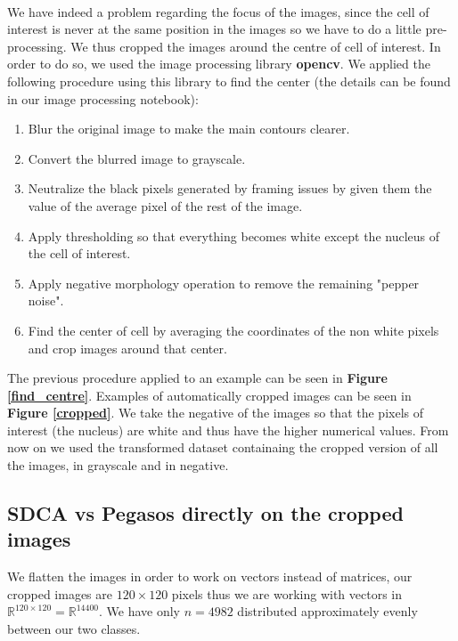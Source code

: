 \documentclass[10pt,a4paper]{article}
\begin{document}
\paragraph{}
We have indeed a problem regarding the focus of the images, since the cell of interest is never at the same position in the images so we have to do a little pre-processing. We thus cropped the images around the centre of cell of interest. In order to do so, we used the image processing library \textbf{opencv}. We applied the following procedure using this library to find the center (the details can be found in our image processing notebook): 
\begin{enumerate}
	\item Blur the original image to make the main contours clearer.
	\item Convert the blurred image to grayscale.
	\item Neutralize the black pixels generated by framing issues by given them the value of the average pixel of the rest of the image.
	\item Apply thresholding so that everything becomes white except the nucleus of the cell of interest.
	\item Apply negative morphology operation to remove the remaining "pepper noise".
	\item Find the center of cell by averaging the coordinates of the non white pixels and crop images around that center.
\end{enumerate}

The previous procedure applied to an example can be seen in \textbf{Figure  \ref{find_centre}}. Examples of automatically cropped images can be seen in \textbf{Figure \ref{cropped}}. We take the negative of the images so that the pixels of interest (the nucleus) are white and thus have the higher numerical values. From now on we used the transformed dataset containaing the cropped version of all the images, in grayscale and in negative.



\subsection {SDCA vs Pegasos directly on the cropped images}

We flatten the images in order to work on vectors instead of matrices, our cropped images are $120 \times 120$ pixels thus we are working with vectors in $\mathbb{R}^{120\times120} = \mathbb{R}^{14400}$. We have only $n=4982$ distributed approximately evenly between our two classes.
\end{document}
